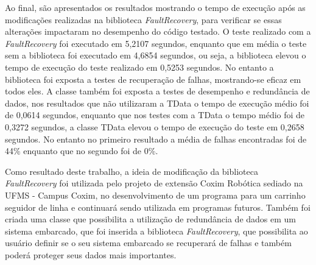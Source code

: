 Ao final, são apresentados os resultados  mostrando o tempo de execução após as modificações realizadas na biblioteca \textit{FaultRecovery}, para verificar se essas alterações impactaram no desempenho do código testado. O teste realizado com a \textit{FaultRecovery} foi executado em 5,2107 segundos, enquanto que em média o teste sem a biblioteca foi executado em 4,6854 segundos, ou seja, a biblioteca elevou o tempo de execução do teste realizado em 0,5253 segundos. No entanto a biblioteca foi exposta a testes de recuperação de falhas, mostrando-se eficaz em todos eles. A classe também foi exposta a testes de desempenho e redundância de dados, nos resultados que não utilizaram a TData o tempo de execução médio foi de 0,0614 segundos, enquanto que nos testes com a TData o tempo médio foi de 0,3272 segundos, a classe TData elevou o tempo de execução do teste em 0,2658 segundos. No entanto no primeiro resultado a média de falhas encontradas foi de 44\% enquanto que no segundo foi de 0\%.

Como resultado deste trabalho, a ideia de modificação da biblioteca \textit{FaultRecovery} foi utilizada pelo projeto de extensão Coxim Robótica sediado na UFMS - Campus Coxim, no desenvolvimento de um programa para um carrinho seguidor de linha e continuará sendo utilizada em programas futuros. Também foi criada uma classe que possibilita a utilização de redundância de dados em um sistema embarcado, que foi inserida a biblioteca \textit{FaultRecovery}, que possibilita ao usuário definir se o seu sistema embarcado se recuperará de falhas e também poderá proteger seus dados mais importantes.